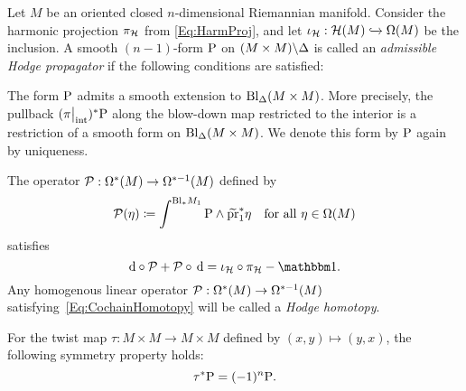 \documentclass[\MainFolder/Text.tex]{subfiles}
\begin{document}
\begin{Def} \label{Def:GreenKernel}
Let $M$ be an oriented closed $n$-dimensional Riemannian manifold.
Consider the harmonic projection $\pi_{\mathcal{H}}$ from \eqref{Eq:HarmProj}, and let $\iota_{\mathcal{H}}: \mathcal{H}(M) \xhookrightarrow{} \Omega(M)$ be the inclusion.
A smooth $(n-1)$-form $\mathrm{P}$ on $(M\times M)\backslash \Delta$ is called an \emph{admissible Hodge propagator} if the following conditions are satisfied:
\begin{PlainList}
\item The form $\mathrm{P}$ admits a smooth extension to $\mathrm{Bl}_\Delta(M\times M)$.
More precisely, the pullback $(\Restr{\pi}{\mathrm{int}})^* \Prpg$ along the blow-down map restricted to the interior is a restriction of a smooth form on $\mathrm{Bl}_\Delta(M\times M)$.
We denote this form by $\mathrm{P}$ again by uniqueness.
\item The operator $\mathcal{P}: \Omega^*(M) \rightarrow \Omega^{*-1}(M)$ defined by
\begin{equation} \label{Eq:SchwKer}
\mathcal{P}(\eta) \coloneqq \int^{\mathrm{Bl}_* M_1} \mathrm{P} \wedge \widetilde{\operatorname{\mathrm{pr}}}_1^* \eta \quad \text{for all }\eta\in \Omega(M)
\end{equation}
satisfies
\begin{equation} \label{Eq:CochainHomotopy}
\Dd\circ\Htp + \Htp\circ\,\Dd = \iota_{\Harm}\circ \pi_{\Harm} - \Id.
\end{equation}
Any homogenous linear operator $\mathcal{P}: \Omega^*(M) \rightarrow \Omega^{*-1}(M)$ satisfying~\eqref{Eq:CochainHomotopy} will be called a \emph{Hodge homotopy}.%
\item For the twist map $\tau: M \times M \rightarrow M \times M$ defined by $(x,y)\mapsto (y,x)$, the following symmetry property holds:
\begin{equation}\label{Eq:SymProp}
\tau^* \mathrm{P} = (-1)^n \mathrm{P}. 
\end{equation}
\end{PlainList}
\end{Def}
\end{document}
